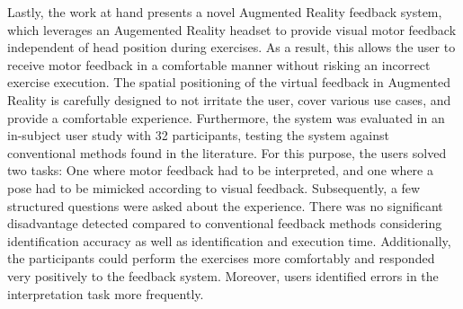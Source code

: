 Lastly, the work at hand presents a novel Augmented Reality feedback system, which leverages an Augemented Reality headset to provide visual motor feedback independent of head position during exercises.
As a result, this allows the user to receive motor feedback in a comfortable manner without risking an incorrect exercise execution.
The spatial positioning of the virtual feedback in Augmented Reality is carefully designed to not irritate the user, cover various use cases, and provide a comfortable experience.
Furthermore, the system was evaluated in an in-subject user study with 32 participants, testing the system against conventional methods found in the literature.
For this purpose, the users solved two tasks: One where motor feedback had to be interpreted, and one where a pose had to be mimicked according to visual feedback.
Subsequently, a few structured questions were asked about the experience.
There was no significant disadvantage detected compared to conventional feedback methods considering identification accuracy as well as identification and execution time.
Additionally, the participants could perform the exercises more comfortably and responded very positively to the feedback system.
Moreover, users identified errors in the interpretation task more frequently.

